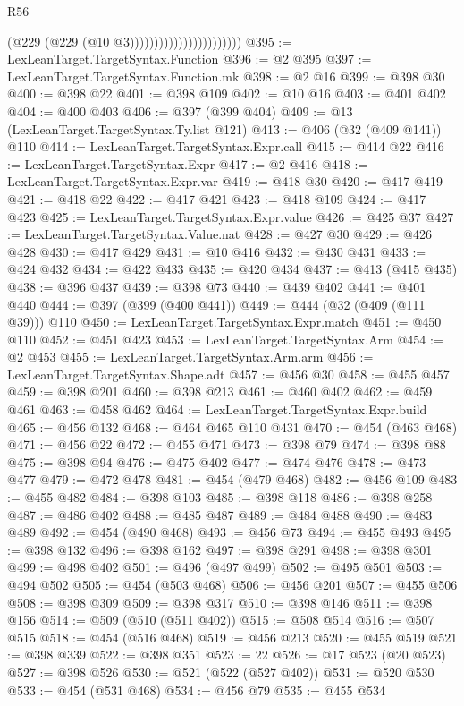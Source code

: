 \begin{lexlean}{R56}
\begin{coremodule}
                                            (@229 (@229 (@10 @3)))))))))))))))))))))))
@395 := LexLeanTarget.TargetSyntax.Function
@396 := @2 @395
@397 := LexLeanTarget.TargetSyntax.Function.mk
@398 := @2 @16
@399 := @398 @30
@400 := @398 @22
@401 := @398 @109
@402 := @10 @16
@403 := @401 @402
@404 := @400 @403
@406 := @397 (@399 @404)
@409 := @13 (LexLeanTarget.TargetSyntax.Ty.list @121)
@413 := @406 (@32 (@409 @141)) @110
@414 := LexLeanTarget.TargetSyntax.Expr.call
@415 := @414 @22
@416 := LexLeanTarget.TargetSyntax.Expr
@417 := @2 @416
@418 := LexLeanTarget.TargetSyntax.Expr.var
@419 := @418 @30
@420 := @417 @419
@421 := @418 @22
@422 := @417 @421
@423 := @418 @109
@424 := @417 @423
@425 := LexLeanTarget.TargetSyntax.Expr.value
@426 := @425 @37
@427 := LexLeanTarget.TargetSyntax.Value.nat
@428 := @427 @30
@429 := @426 @428
@430 := @417 @429
@431 := @10 @416
@432 := @430 @431
@433 := @424 @432
@434 := @422 @433
@435 := @420 @434
@437 := @413 (@415 @435)
@438 := @396 @437
@439 := @398 @73
@440 := @439 @402
@441 := @401 @440
@444 := @397 (@399 (@400 @441))
@449 := @444 (@32 (@409 (@111 @39))) @110
@450 := LexLeanTarget.TargetSyntax.Expr.match
@451 := @450 @110
@452 := @451 @423
@453 := LexLeanTarget.TargetSyntax.Arm
@454 := @2 @453
@455 := LexLeanTarget.TargetSyntax.Arm.arm
@456 := LexLeanTarget.TargetSyntax.Shape.adt
@457 := @456 @30
@458 := @455 @457
@459 := @398 @201
@460 := @398 @213
@461 := @460 @402
@462 := @459 @461
@463 := @458 @462
@464 := LexLeanTarget.TargetSyntax.Expr.build
@465 := @456 @132
@468 := @464 @465 @110 @431
@470 := @454 (@463 @468)
@471 := @456 @22
@472 := @455 @471
@473 := @398 @79
@474 := @398 @88
@475 := @398 @94
@476 := @475 @402
@477 := @474 @476
@478 := @473 @477
@479 := @472 @478
@481 := @454 (@479 @468)
@482 := @456 @109
@483 := @455 @482
@484 := @398 @103
@485 := @398 @118
@486 := @398 @258
@487 := @486 @402
@488 := @485 @487
@489 := @484 @488
@490 := @483 @489
@492 := @454 (@490 @468)
@493 := @456 @73
@494 := @455 @493
@495 := @398 @132
@496 := @398 @162
@497 := @398 @291
@498 := @398 @301
@499 := @498 @402
@501 := @496 (@497 @499)
@502 := @495 @501
@503 := @494 @502
@505 := @454 (@503 @468)
@506 := @456 @201
@507 := @455 @506
@508 := @398 @309
@509 := @398 @317
@510 := @398 @146
@511 := @398 @156
@514 := @509 (@510 (@511 @402))
@515 := @508 @514
@516 := @507 @515
@518 := @454 (@516 @468)
@519 := @456 @213
@520 := @455 @519
@521 := @398 @339
@522 := @398 @351
@523 := 22
@526 := @17 @523 (@20 @523)
@527 := @398 @526
@530 := @521 (@522 (@527 @402))
@531 := @520 @530
@533 := @454 (@531 @468)
@534 := @456 @79
@535 := @455 @534

\end{coremodule}
\end{lexlean}
